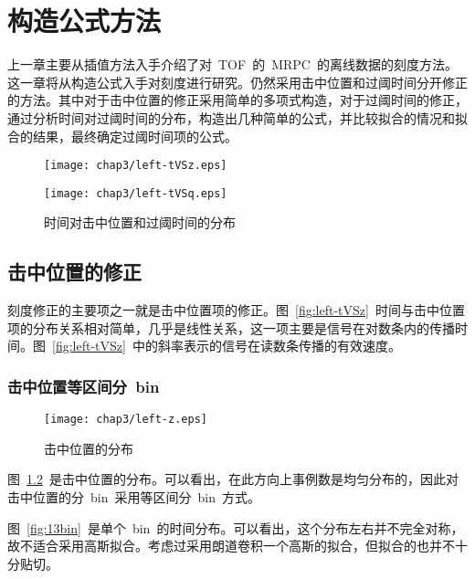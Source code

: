 \chapter{构造公式方法}
上一章主要从插值方法入手介绍了对~TOF~的~MRPC~的离线数据的刻度方法。这一章将从构造公式入手对刻度进行研究。仍然采用击中位置和过阈时间分开修正的方法。其中对于击中位置的修正采用简单的多项式构造，对于过阈时间的修正，通过分析时间对过阈时间的分布，构造出几种简单的公式，并比较拟合的情况和拟合的结果，最终确定过阈时间项的公式。

\begin{figure}[!h]
\begin{minipage}[!h]{0.5\linewidth}
\texttt{[image: chap3/left-tVSz.eps]}
\label{fig:left-tVSz}
\end{minipage}%
\hfill
\begin{minipage}[!h]{0.5\linewidth}
\texttt{[image: chap3/left-tVSq.eps]}
\label{fig:left-tVSq}
\end{minipage}
\caption{时间对击中位置和过阈时间的分布}
\end{figure}

\section{击中位置的修正}
刻度修正的主要项之一就是击中位置项的修正。图~\ref{fig:left-tVSz}~时间与击中位置项的分布关系相对简单，几乎是线性关系，这一项主要是信号在对数条内的传播时间。图~\ref{fig:left-tVSz}~中的斜率表示的信号在读数条传播的有效速度。
\subsection{击中位置等区间分~bin~}

\begin{figure}[htbp]
\centering
\texttt{[image: chap3/left-z.eps]}
\caption{击中位置的分布}
\label{fig:left-z}
\end{figure}

图~\ref{fig:left-z}~是击中位置的分布。可以看出，在此方向上事例数是均匀分布的，因此对击中位置的分~bin~采用等区间分~bin~方式。

图~\ref{fig:13bin}~是单个~bin~的时间分布。可以看出，这个分布左右并不完全对称，故不适合采用高斯拟合。考虑过采用朗道卷积一个高斯的拟合，但拟合的也并不十分贴切。

